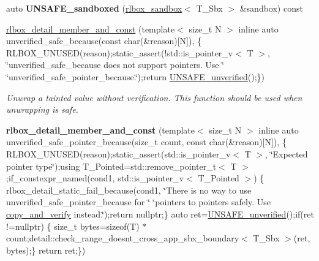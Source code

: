 \begin{DoxyCompactItemize}
\mbox{\label{classrlbox_1_1tainted__base__impl_a2fb81eab8dc3839f351d6d89410c2350}} 
auto {\bfseries U\+N\+S\+A\+F\+E\+\_\+sandboxed} (\hyperlink{classrlbox_1_1rlbox__sandbox}{rlbox\+\_\+sandbox}$<$ T\+\_\+\+Sbx $>$ \&sandbox) const
\item 
\hyperlink{classrlbox_1_1tainted__base__impl_ac7d2f71a8fc72b922bfa1260d4a7ac94}{rlbox\+\_\+detail\+\_\+member\+\_\+and\+\_\+const} (template$<$ size\+\_\+t N $>$ inline auto unverified\+\_\+safe\+\_\+because(const char(\&reason)\mbox{[}N\mbox{]}), \{ R\+L\+B\+O\+X\+\_\+\+U\+N\+U\+S\+ED(reason);static\+\_\+assert(!std\+::is\+\_\+pointer\+\_\+v$<$ T $>$, \char`\"{}unverified\+\_\+safe\+\_\+because does not support pointers. Use \char`\"{} \char`\"{}unverified\+\_\+safe\+\_\+pointer\+\_\+because.\char`\"{});return \hyperlink{classrlbox_1_1tainted__base__impl_a01acab6b4bd8137afa03cf4b2678844f}{U\+N\+S\+A\+F\+E\+\_\+unverified}();\})
\begin{DoxyCompactList}\small\item\em Unwrap a tainted value without verification. This function should be used when unwrapping is safe. \end{DoxyCompactList}\item 
\mbox{\label{classrlbox_1_1tainted__base__impl_af9767a70f0e97d74c5d70a6511cff5d1}} 
{\bfseries rlbox\+\_\+detail\+\_\+member\+\_\+and\+\_\+const} (template$<$ size\+\_\+t N $>$ inline auto unverified\+\_\+safe\+\_\+pointer\+\_\+because(size\+\_\+t count, const char(\&reason)\mbox{[}N\mbox{]}), \{ R\+L\+B\+O\+X\+\_\+\+U\+N\+U\+S\+ED(reason);static\+\_\+assert(std\+::is\+\_\+pointer\+\_\+v$<$ T $>$, \char`\"{}Expected pointer type\char`\"{});using T\+\_\+\+Pointed=std\+::remove\+\_\+pointer\+\_\+t$<$ T $>$;if\+\_\+constexpr\+\_\+named(cond1, std\+::is\+\_\+pointer\+\_\+v$<$ T\+\_\+\+Pointed $>$) \{ rlbox\+\_\+detail\+\_\+static\+\_\+fail\+\_\+because(cond1, \char`\"{}There is no way to use unverified\+\_\+safe\+\_\+pointer\+\_\+because for \char`\"{} \char`\"{}\textquotesingle{}pointers to pointers\textquotesingle{} safely. Use \hyperlink{classrlbox_1_1tainted__base__impl_a701759aedd637f48cc97a0e6ada1c8a6}{copy\+\_\+and\+\_\+verify} instead.\char`\"{});return nullptr;\} auto ret=\hyperlink{classrlbox_1_1tainted__base__impl_a01acab6b4bd8137afa03cf4b2678844f}{U\+N\+S\+A\+F\+E\+\_\+unverified}();if(ret !=nullptr) \{ size\+\_\+t bytes=sizeof(T) $\ast$count;detail\+::check\+\_\+range\+\_\+doesnt\+\_\+cross\+\_\+app\+\_\+sbx\+\_\+boundary$<$ T\+\_\+\+Sbx $>$(ret, bytes);\} return ret;\})

\end{DoxyCompactItemize}
